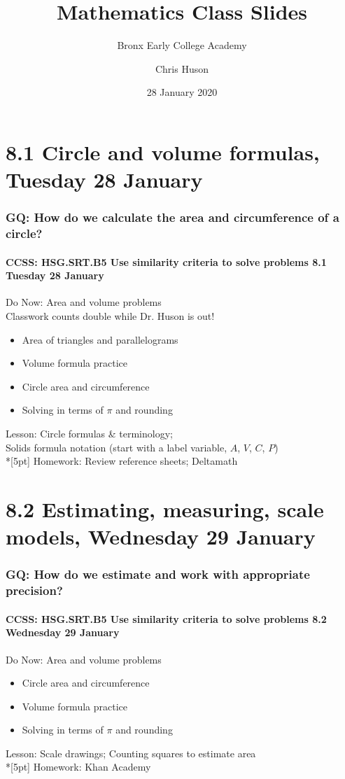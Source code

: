 \documentclass{beamer}
\title{Mathematics Class Slides}
\subtitle{Bronx Early College Academy}
\author{Chris Huson}
\date{28 January 2020}
\begin{document}
\frame{\titlepage}
\section[Outline]{}
\frame{\tableofcontents}

\section{8.1 Circle and volume formulas, Tuesday 28 January}
\frame
{
  \frametitle{GQ: How do we calculate the area and circumference of a circle?}
  \framesubtitle{CCSS: HSG.SRT.B5 Use similarity criteria to solve problems \hfill \alert{8.1 Tuesday 28 January}}

  \begin{block}{Do Now: Area and volume problems\\[0.25cm]
    \alert{Classwork counts double while Dr. Huson is out!}}
  \begin{itemize}
    \item Area of triangles and parallelograms
    \item Volume formula practice
    \item Circle area and circumference
    \item Solving in terms of $\pi$ and rounding
  \end{itemize}
  \end{block}
  Lesson: Circle formulas \& terminology; \\
  Solids formula notation (start with a label variable, $A$, $V$, $C$, $P$)\\*[5pt]
  Homework: Review reference sheets; Deltamath
}

\section{8.2 Estimating, measuring, scale models, Wednesday 29 January}
\frame
{
  \frametitle{GQ: How do we estimate and work with appropriate precision?}
  \framesubtitle{CCSS: HSG.SRT.B5 Use similarity criteria to solve problems \hfill \alert{8.2 Wednesday 29 January}}

  \begin{block}{Do Now: Area and volume problems}
  \begin{itemize}
    \item Circle area and circumference
    \item Volume formula practice
    \item Solving in terms of $\pi$ and rounding
  \end{itemize}
  \end{block}
  Lesson: Scale drawings; Counting squares to estimate area\\*[5pt]
  Homework: Khan Academy
}
\end{document}
